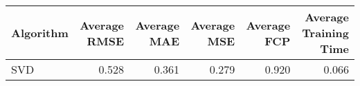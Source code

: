 \begin{tabular}{lrrrrr}
\toprule
Algorithm & Average RMSE & Average MAE & Average MSE & Average FCP & Average Training Time \\
\midrule
SVD & 0.528 & 0.361 & 0.279 & 0.920 & 0.066 \\
\bottomrule
\end{tabular}
